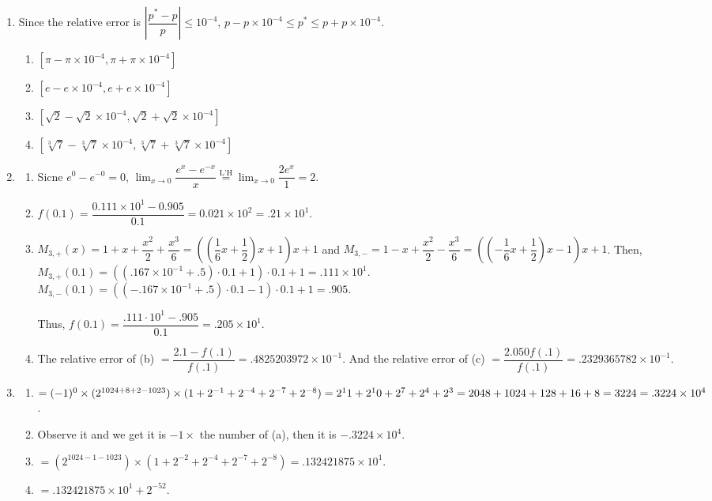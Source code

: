 \documentclass[12pt]{article}
\begin{document}
\begin{enumerate}
    \item Since the relative error is $\left|\dfrac{p^*-p}{p}\right| \leq 10^{-4}$, $p - p\times 10^{-4} \leq p^* \leq p + p\times 10^{-4}$.
    \begin{enumerate}
        \item $[\pi - \pi\times 10^{-4}, \pi + \pi\times 10^{-4}]$
        \item $[e - e\times 10^{-4}, e + e\times 10^{-4}]$
        \item $[\sqrt{2} - \sqrt{2}\times 10^{-4}, \sqrt{2} + \sqrt{2}\times 10^{-4}]$
        \item $[\sqrt[3]{7} - \sqrt[3]{7}\times 10^{-4}, \sqrt[3]{7} + \sqrt[3]{7}\times 10^{-4}]$
    \end{enumerate}

    \item \begin{enumerate}
        \item Sicne $e^{0} - e^{-0} = 0$, $\displaystyle\lim_{x \to 0} \dfrac{e^{x} - e^{-x}}{x} \overset{\text{L'H}}{=} \displaystyle\lim_{x\to 0} \dfrac{2e^{x}}{1} = 2$.
        \item $f(0.1) = \dfrac{0.111\times 10^1 - 0.905}{0.1} = 0.021\times 10^2 = .21 \times 10^1$.
        \item $M_{3, +}(x) = 1 + x + \dfrac{x^2}{2} + \dfrac{x^3}{6} = ((\dfrac{1}{6}x + \dfrac{1}{2})x + 1)x + 1$ 
        and $M_{3, -} = 1 - x + \dfrac{x^2}{2} - \dfrac{x^3}{6} = ((-\dfrac{1}{6}x + \dfrac{1}{2})x - 1)x + 1$.
        Then, $M_{3, +}(0.1) =  ((.167\times 10^{-1} + .5)\cdot 0.1 + 1) \cdot 0.1 + 1 = .111\times 10^{1}$.
        $M_{3, -}(0.1) = ((-.167\times 10^{-1} + .5)\cdot 0.1 - 1)\cdot 0.1 + 1 = .905$.

        Thus, $f(0.1) = \dfrac{.111\cdot 10^1 - .905}{0.1} = .205 \times 10^1$.
    
        \item The relative error of (b) $= \dfrac{2.1 - f(.1)}{f(.1)} = .4825203972 \times 10^{-1}$.
        And the relative error of (c) $= \dfrac{2.05 0 f(.1)}{f(.1)} = .2329365782 \times 10^{-1}$.
    \end{enumerate}

    \item \begin{enumerate}
        \item $= (-1)^0 \times (2^{1024+8+2 - 1023}) \times (1 + 2^{-1} + 2^{-4} + 2^{-7} + 2^{-8}) = 2^11 + 2^10 + 2^7 + 2^4 + 2^3\\
        = 2048+1024+128+16+8 = 3224 = .3224 \times 10^{4}$.
        \item Observe it and we get it is $-1\times $ the number of (a), then it is $-.3224 \times 10^{4}$.
        \item $= (2^{1024-1 - 1023}) \times (1 + 2^{-2} + 2^{-4} + 2^{-7} + 2^{-8}) = .132421875 \times 10^1$.
        \item $= .132421875 \times 10^1 + 2^{-52}$.
    \end{enumerate}


\end{enumerate}
\end{document}

